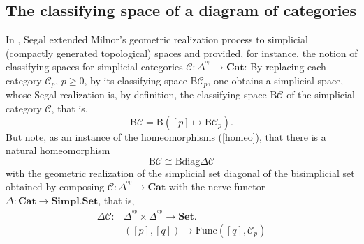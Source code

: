 \documentclass[]{amsart}
\begin{document}
\subsection{The classifying space of a diagram of  categories}
In \cite{segal}, Segal extended Milnor's geometric realization process to simplicial (compactly
generated topological) spaces and provided, for instance, the notion of classifying spaces for
simplicial categories ${\ensuremath{\mathcal{C}}}:\Delta^{\!{^\mathrm{op}}}\to {\ensuremath{\mathbf{Cat}}}$: By replacing each category ${\ensuremath{\mathcal{C}}}_p$,
$p\geq 0$, by its classifying space ${\ensuremath{\mathrm{B}}}{\ensuremath{\mathcal{C}}}_p$, one obtains a simplicial space, whose Segal
realization is, by definition, the classifying space ${\ensuremath{\mathrm{B}}}{\ensuremath{\mathcal{C}}}$ of the simplicial category ${\ensuremath{\mathcal{C}}}$,
that is,
\begin{equation}\label{p.1.8} {\ensuremath{\mathrm{B}}}{\ensuremath{\mathcal{C}}}={\ensuremath{\mathrm{B}}}([p]\mapsto {\ensuremath{\mathrm{B}}}{\ensuremath{\mathcal{C}}}_p). \end{equation} But
note, as an instance of the homeomorphisms (\ref{homeo}), that there is a natural homeomorphism
\begin{equation}\label{p.1.9} {\ensuremath{\mathrm{B}}}{\ensuremath{\mathcal{C}}} \cong {\ensuremath{\mathrm{B}}}{\ensuremath{\mathrm{diag}}} \Delta {\ensuremath{\mathcal{C}}} \end{equation}
 with the geometric realization of the simplicial set diagonal of the bisimplicial set
obtained by composing ${\ensuremath{\mathcal{C}}}:\Delta^{\!{^\mathrm{op}}}\to {\ensuremath{\mathbf{Cat}}}$ with the nerve functor ${\Delta:{\ensuremath{\mathbf{Cat}}} \to{\ensuremath{\mathbf{Simpl.Set}}}} $, that is, $$\begin{array}{ll}\Delta{\ensuremath{\mathcal{C}}}:&\Delta^{\!{^\mathrm{op}}}\times \Delta^{\!{^\mathrm{op}}}\longrightarrow {\ensuremath{\mathbf{Set}}}.\\[4pt]
&([p],[q])\longmapsto {\ensuremath{\mathrm{Func}}}([q],{\ensuremath{\mathcal{C}}}_p)\end{array}$$
\end{document}
